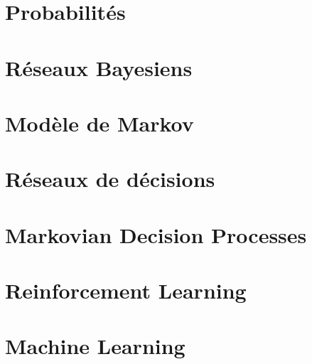\documentclass[a4paper, 12pt]{extarticle}
\begin{document}
\section{Probabilités} %
\label{sec:probabilites}

\newpage

\section{Réseaux Bayesiens} %
\label{sec:reseaux_bayesiens}



\section{Modèle de Markov} %
\label{sec:modele_de_markov}


\section{Réseaux de décisions} %
\label{sec:reseaux_de_decisions}


\section{Markovian Decision Processes} %
\label{sec:markovian_decision_processes}


\section{Reinforcement Learning} %
\label{sec:reinforcement_learning}


\section{Machine Learning} %
\label{sec:machine_learning}



\end{document}
